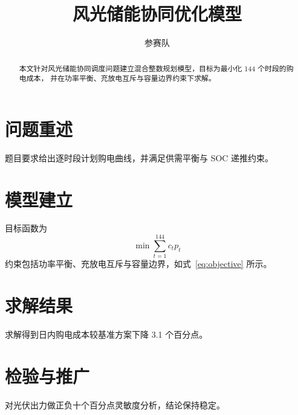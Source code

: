 \documentclass[12pt]{ctexart}
\title{风光储能协同优化模型}
\author{参赛队}
\begin{document}
\maketitle
\begin{abstract}
本文针对风光储能协同调度问题建立混合整数规划模型，目标为最小化 144 个时段的购电成本，
并在功率平衡、充放电互斥与容量边界约束下求解。
\end{abstract}
\section{问题重述}
题目要求给出逐时段计划购电曲线，并满足供需平衡与 SOC 递推约束。
\section{模型建立}
目标函数为
\begin{equation}
\min \sum_{t=1}^{144} c_t p_t
\label{eq:objective}
\end{equation}
约束包括功率平衡、充放电互斥与容量边界，如式~\eqref{eq:objective} 所示。
\section{求解结果}
求解得到日内购电成本较基准方案下降 3.1 个百分点。
\section{检验与推广}
对光伏出力做正负十个百分点灵敏度分析，结论保持稳定。
\end{document}
